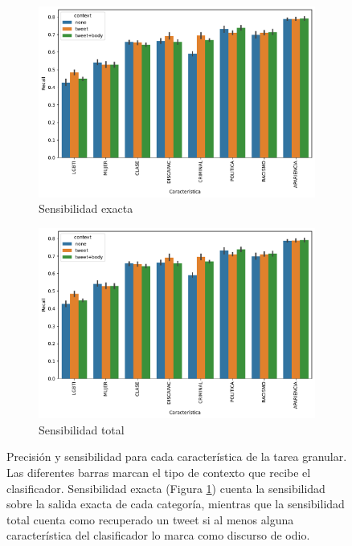 \begin{figure}[t]
    \centering
    \small
    \begin{subfigure}[b]{0.45\textwidth}
        \centering
        \includegraphics[width=\textwidth]{img/06/exact_recall_barplot.pdf}
        \caption{Sensibilidad exacta}
        \label{subfig:exact_recall}
    \end{subfigure}
    \begin{subfigure}[b]{0.45\textwidth}
        \centering
        \includegraphics[width=\textwidth]{img/06/hate_recall_barplot.pdf}
        \caption{Sensibilidad total}
        \label{subfig:total_recall}
    \end{subfigure}
    \caption{Precisión y sensibilidad para cada característica de la tarea granular. Las diferentes barras marcan el tipo de contexto que recibe el clasificador. Sensibilidad exacta (Figura \ref{subfig:exact_recall}) cuenta la sensibilidad sobre la salida exacta de cada categoría, mientras que la sensibilidad total cuenta como recuperado un tweet si al menos alguna característica del clasificador lo marca como discurso de odio.}
    \label{fig:precision_recall_granular_classifier}
\end{figure}


